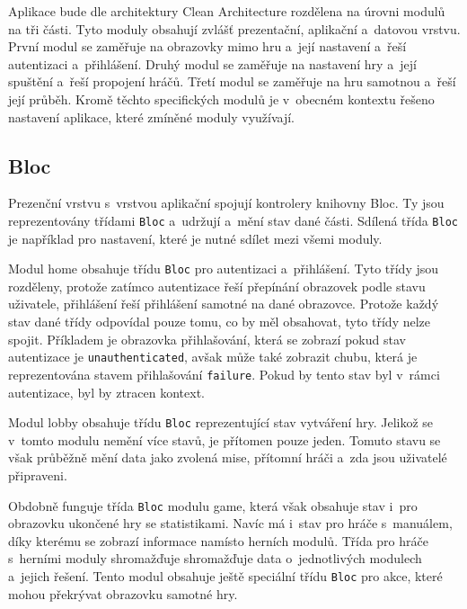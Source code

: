 Aplikace bude dle architektury Clean Architecture rozdělena
na úrovni modulů na tři části.
Tyto moduly obsahují zvlášť prezentační, aplikační a~datovou vrstvu.
První modul se zaměřuje na obrazovky mimo hru a~její nastavení
a~řeší autentizaci a~přihlášení.
Druhý modul se zaměřuje na nastavení hry a~její spuštění a~řeší propojení hráčů.
Třetí modul se zaměřuje na hru samotnou a~řeší její průběh.
Kromě těchto specifických modulů je v~obecném kontextu řešeno nastavení
aplikace,
které zmíněné moduly využívají.

\subsection{Bloc}

Prezenční vrstvu s~vrstvou aplikační spojují kontrolery knihovny Bloc.
Ty jsou reprezentovány třídami \texttt{Bloc} a~udržují a~mění stav
dané části.
Sdílená třída \texttt{Bloc} je například pro nastavení,
které je nutné sdílet mezi všemi moduly.

Modul home obsahuje třídu \texttt{Bloc} pro autentizaci a~přihlášení.
Tyto třídy jsou rozděleny,
protože zatímco autentizace řeší přepínání obrazovek podle stavu uživatele,
přihlášení řeší přihlášení samotné na dané obrazovce.
Protože každý stav dané třídy odpovídal pouze tomu,
co by měl obsahovat,
tyto třídy nelze spojit.
Příkladem je obrazovka přihlašování,
která se zobrazí pokud stav autentizace je \texttt{unauthenticated},
avšak může také zobrazit chubu,
která je reprezentována stavem přihlašování \texttt{failure}.
Pokud by tento stav byl v~rámci autentizace,
byl by ztracen kontext.

Modul lobby obsahuje třídu \texttt{Bloc} reprezentující stav
vytváření hry.
Jelikož se v~tomto modulu nemění více stavů,
je přítomen pouze jeden.
Tomuto stavu se však průběžně mění data jako zvolená mise,
přítomní hráči a~zda jsou uživatelé připraveni.

Obdobně funguje třída \texttt{Bloc} modulu game,
která však obsahuje stav i~pro obrazovku ukončené hry se statistikami.
Navíc má i~stav pro hráče s~manuálem,
díky kterému se zobrazí informace namísto herních modulů.
Třída pro hráče s~herními moduly shromažďuje shromažďuje data o~jednotlivých
modulech a~jejich řešení.
Tento modul obsahuje ještě speciální třídu \texttt{Bloc} pro akce,
které mohou překrývat obrazovku samotné hry.
